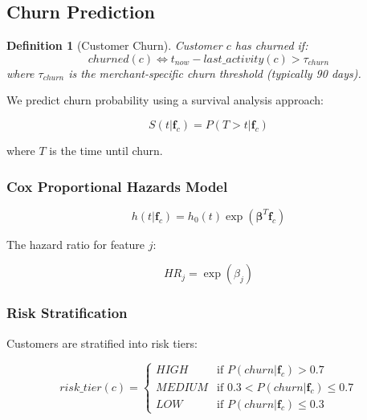 \documentclass[11pt,a4paper]{article}
\newtheorem{definition}[theorem]{Definition}
\begin{document}
\subsection{Churn Prediction}

\begin{definition}[Customer Churn]
Customer $c$ has churned if:
\begin{equation}
churned(c) \iff t_{now} - last\_activity(c) > \tau_{churn}
\end{equation}
where $\tau_{churn}$ is the merchant-specific churn threshold (typically 90 days).
\end{definition}

We predict churn probability using a survival analysis approach:

\begin{equation}
S(t | \mathbf{f}_c) = P(T > t | \mathbf{f}_c)
\end{equation}

where $T$ is the time until churn.

\subsubsection{Cox Proportional Hazards Model}

\begin{equation}
h(t | \mathbf{f}_c) = h_0(t) \exp(\boldsymbol{\beta}^T \mathbf{f}_c)
\end{equation}

The hazard ratio for feature $j$:

\begin{equation}
HR_j = \exp(\beta_j)
\end{equation}

\subsubsection{Risk Stratification}

Customers are stratified into risk tiers:

\begin{equation}
risk\_tier(c) = \begin{cases}
    HIGH & \text{if } P(churn | \mathbf{f}_c) > 0.7 \\
    MEDIUM & \text{if } 0.3 < P(churn | \mathbf{f}_c) \leq 0.7 \\
    LOW & \text{if } P(churn | \mathbf{f}_c) \leq 0.3
\end{cases}
\end{equation}
\end{document}
